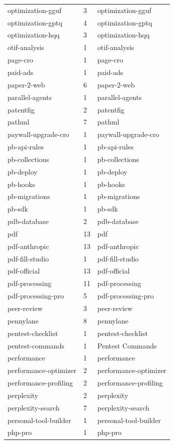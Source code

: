 \begin{longtable}{@{}lll@{}}
optimization-gguf & 3 & optimization-gguf\\
optimization-gptq & 4 & optimization-gptq\\
optimization-hqq & 3 & optimization-hqq\\
otif-analysis & 1 & otif-analysis\\
page-cro & 1 & page-cro\\
paid-ads & 1 & paid-ads\\
paper-2-web & 6 & paper-2-web\\
parallel-agents & 1 & parallel-agents\\
patentfig & 2 & patentfig\\
pathml & 7 & pathml\\
paywall-upgrade-cro & 1 & paywall-upgrade-cro\\
pb-api-rules & 1 & pb-api-rules\\
pb-collections & 1 & pb-collections\\
pb-deploy & 1 & pb-deploy\\
pb-hooks & 1 & pb-hooks\\
pb-migrations & 1 & pb-migrations\\
pb-sdk & 1 & pb-sdk\\
pdb-database & 2 & pdb-database\\
pdf & 13 & pdf\\
pdf-anthropic & 13 & pdf-anthropic\\
pdf-fill-studio & 1 & pdf-fill-studio\\
pdf-official & 13 & pdf-official\\
pdf-processing & 11 & pdf-processing\\
pdf-processing-pro & 5 & pdf-processing-pro\\
peer-review & 3 & peer-review\\
pennylane & 8 & pennylane\\
pentest-checklist & 1 & pentest-checklist\\
pentest-commands & 1 & Pentest Commands\\
performance & 1 & performance\\
performance-optimizer & 2 & performance-optimizer\\
performance-profiling & 2 & performance-profiling\\
perplexity & 2 & perplexity\\
perplexity-search & 7 & perplexity-search\\
personal-tool-builder & 1 & personal-tool-builder\\
php-pro & 1 & php-pro\\

\end{longtable}
